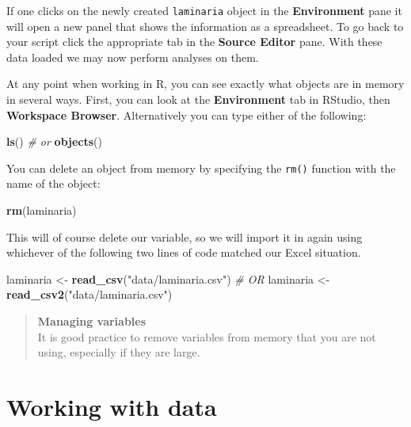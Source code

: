 \documentclass[]{book}
\newenvironment{Shaded}{\begin{snugshade}}{\end{snugshade}}
\newcommand{\KeywordTok}[1]{\textcolor[rgb]{0.13,0.29,0.53}{\textbf{#1}}}
\newcommand{\StringTok}[1]{\textcolor[rgb]{0.31,0.60,0.02}{#1}}
\newcommand{\CommentTok}[1]{\textcolor[rgb]{0.56,0.35,0.01}{\textit{#1}}}
\newcommand{\NormalTok}[1]{#1}
\theoremstyle{definition}
\theoremstyle{definition}
\theoremstyle{definition}
\theoremstyle{remark}
\begin{document}
If one clicks on the newly created \texttt{laminaria} object in the
\textbf{Environment} pane it will open a new panel that shows the
information as a spreadsheet. To go back to your script click the
appropriate tab in the \textbf{Source Editor} pane. With these data
loaded we may now perform analyses on them.

At any point when working in R, you can see exactly what objects are in
memory in several ways. First, you can look at the \textbf{Environment}
tab in RStudio, then \textbf{Workspace Browser}. Alternatively you can
type either of the following:

\begin{Shaded}
\begin{Highlighting}[]
\KeywordTok{ls}\NormalTok{()}
\CommentTok{# or}
\KeywordTok{objects}\NormalTok{()}
\end{Highlighting}
\end{Shaded}

You can delete an object from memory by specifying the \texttt{rm()}
function with the name of the object:

\begin{Shaded}
\begin{Highlighting}[]
\KeywordTok{rm}\NormalTok{(laminaria)}
\end{Highlighting}
\end{Shaded}

This will of course delete our variable, so we will import it in again
using whichever of the following two lines of code matched our Excel
situation.

\begin{Shaded}
\begin{Highlighting}[]
\NormalTok{laminaria <-}\StringTok{ }\KeywordTok{read_csv}\NormalTok{(}\StringTok{"data/laminaria.csv"}\NormalTok{)}
\CommentTok{# OR}
\NormalTok{laminaria <-}\StringTok{ }\KeywordTok{read_csv2}\NormalTok{(}\StringTok{"data/laminaria.csv"}\NormalTok{)}
\end{Highlighting}
\end{Shaded}

\begin{quote}
\textbf{Managing variables}\\
It is good practice to remove variables from memory that you are not
using, especially if they are large.
\end{quote}

\section{Working with data}\label{working-with-data}
\end{document}
